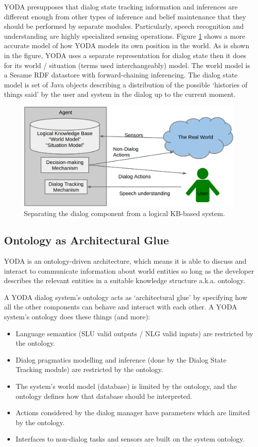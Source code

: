 \documentclass[titlepage]{article}
\begin{document}
YODA presupposes that dialog state tracking information and inferences are different enough from other types of inference and belief maintenance that they should be performed by separate modules.
Particularly, speech recognition and understanding are highly specialized sensing operations.
Figure \ref{separated-logical-kb-agent} shows a more accurate model of how YODA models its own position in the world.
As is shown in the figure, YODA uses a separate representation for dialog state then it does for its world / situation (terms used interchangeably) model.
The world model is a Sesame RDF datastore with forward-chaining inferencing.
The dialog state model is set of Java objects describing a distribution of the possible `histories of things said' by the user and system in the dialog up to the current moment.

\begin{figure}[h!]
\centering
\includegraphics[width=.75\textwidth]{separate_dialog}
\caption{Separating the dialog component from a logical KB-based system.}
\label{separated-logical-kb-agent}
\end{figure}

\subsection{Ontology as Architectural Glue}


YODA is an ontology-driven architecture, which means it is able to discuss and interact to communicate information about world entities so long as the developer describes the relevant entities in a suitable knowledge structure a.k.a. ontology.

A YODA dialog system's ontology acts as `architectural glue' by specifying how all the other components can behave and interact with each other.
A YODA system's ontology does these things (and more):
\begin{itemize}
\item Language semantics (SLU valid outputs / NLG valid inputs) are restricted by the ontology.
\item Dialog pragmatics modelling and inference (done by the Dialog State Tracking module) are restricted by the ontology.
\item The system's world model (database) is limited by the ontology, and the ontology defines how that database should be interpreted.
\item Actions considered by the dialog manager have parameters which are limited by the ontology.
\item Interfaces to non-dialog tasks and sensors are built on the system ontology.
\end{itemize}
\end{document}
